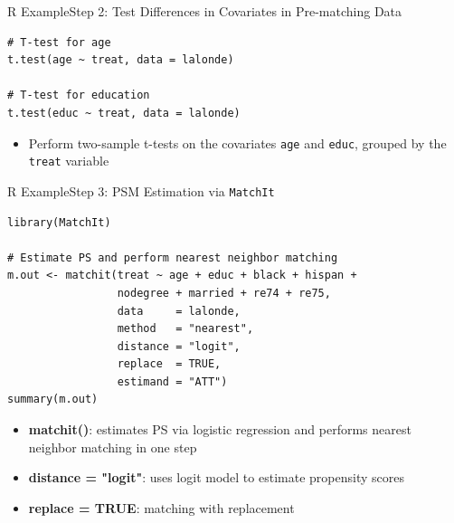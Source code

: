 \documentclass[dvipsnames,hyperref={pdfpagelabels=false}]{beamer}
\begin{document}
\begin{frame}[fragile]{R Example}{Step 2: Test Differences in Covariates in Pre-matching Data}
\begin{lstlisting}
# T-test for age
t.test(age ~ treat, data = lalonde)

# T-test for education
t.test(educ ~ treat, data = lalonde)
\end{lstlisting}
	\begin{itemize}
		\vspace{0.2cm}
		\item Perform two-sample t-tests on the covariates \texttt{age} and \texttt{educ}, grouped by the \texttt{treat} variable
	
	\end{itemize}
\end{frame}


\begin{frame}[fragile]{R Example}{Step 3: PSM Estimation via \texttt{MatchIt}}
\begin{lstlisting}
library(MatchIt)

# Estimate PS and perform nearest neighbor matching
m.out <- matchit(treat ~ age + educ + black + hispan +
                 nodegree + married + re74 + re75,
                 data     = lalonde,
                 method   = "nearest",
                 distance = "logit",
                 replace  = TRUE,
                 estimand = "ATT")
summary(m.out)
\end{lstlisting}
\begin{itemize}
    \vspace{0.2cm}
    \item \textbf{matchit()}: estimates PS via logistic regression
    and performs nearest neighbor matching in one step
    \vspace{0.2cm}
    \item \textbf{distance = "logit"}: uses logit model to estimate
    propensity scores
    \vspace{0.2cm}
    \item \textbf{replace = TRUE}: matching with replacement
\end{itemize}
\end{frame}
\end{document}

